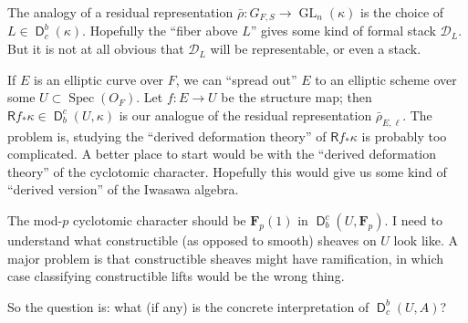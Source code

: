 \documentclass{amsart}
\DeclareMathOperator{\derive}{\mathsf{D}}
\DeclareMathOperator{\GL}{GL}
\DeclareMathOperator{\spec}{Spec}
\newcommand{\cD}{\mathcal{D}}
\newcommand{\dF}{\mathbf{F}}
\begin{document}
The analogy of a residual representation $\bar\rho:G_{F,S}\to \GL_n(\kappa)$ is 
the choice of $L\in \derive_c^b(\kappa)$. Hopefully the ``fiber above $L$'' 
gives some kind of formal stack $\cD_L$. But it is not at all obvious that 
$\cD_L$ will be representable, or even a stack. 

If $E$ is an elliptic curve over $F$, we can ``spread out'' $E$ to an elliptic 
scheme over some $U\subset \spec(O_F)$. Let $f:E\to U$ be the structure map; 
then $\mathsf R f_\ast \kappa\in \derive_b^c(U,\kappa)$ is our analogue of the 
residual representation $\bar\rho_{E,\ell}$. The problem is, studying the 
``derived deformation theory'' of $\mathsf Rf_\ast \kappa$ is probably too 
complicated. A better place to start would be with the ``derived deformation 
theory'' of the cyclotomic character. Hopefully this would give us some kind of 
``derived version'' of the Iwasawa algebra. 

The mod-$p$ cyclotomic character should be $\dF_p(1)$ in 
$\derive_b^c(U,\dF_p)$. I need to understand what constructible (as opposed to 
smooth) sheaves on $U$ look like. A major problem is that constructible sheaves 
might have ramification, in which case classifying constructible lifts would be 
the wrong thing. 

So the question is: what (if any) is the concrete interpretation of 
$\derive_c^b(U,A)$? 
\end{document}
